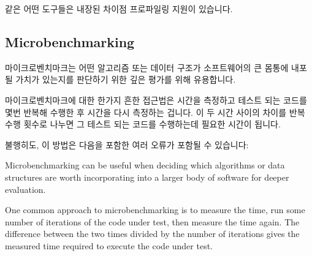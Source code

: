  같은 어떤 도구들은 내장된 차이점 프로파일링 지원이 있습니다.

\subsection{Microbenchmarking}
\label{sec:debugging:Microbenchmarking}

마이크로벤치마크는 어떤 알고리즘 또는 데이터 구조가 소프트웨어의 큰 몸통에
내포될 가치가 있는지를 판단하기 위한 깊은 평가를 위해 유용합니다.

마이크로벤치마크에 대한 한가지 흔한 접근법은 시간을 측정하고 테스트 되는 코드를
몇번 반복해 수행한 후 시간을 다시 측정하는 겁니다.
이 두 시간 사이의 차이를 반복 수행 횟수로 나누면 그 테스트 되는 코드를
수행하는데 필요한 시간이 됩니다.

불행히도, 이 방법은 다음을 포함한 여러 오류가 포함될 수 있습니다:

\iffalse

Microbenchmarking can be useful when deciding which algorithms or
data structures are worth incorporating into a larger body of software
for deeper evaluation.

One common approach to microbenchmarking is to measure the time,
run some number of iterations of the code
under test, then measure the time again.
The difference between the two times divided by the number of iterations
gives the measured time required to execute the code under test.

